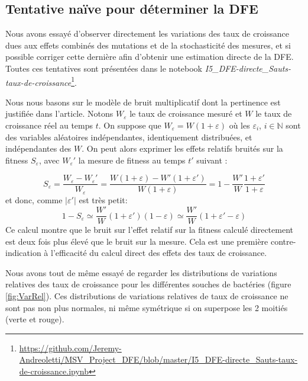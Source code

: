 \documentclass[12pt]{article}
\newcommand{\abs}[1]{\left|#1\right|}
\newcommand{\En}{\mathbb{N}}
\begin{document}
\FloatBarrier
\subsection{Tentative naïve pour déterminer la DFE}

Nous avons essayé d'observer directement les variations des taux de croissance dues aux effets combinés des mutations et de la stochasticité des mesures, et si possible corriger cette dernière afin d'obtenir une estimation directe de la DFE. Toutes ces tentatives sont présentées dans le notebook \emph{I5\_DFE-directe\_Sauts-taux-de-croissance}\footnote{\url{https://github.com/Jeremy-Andreoletti/MSV_Project_DFE/blob/master/I5_DFE-directe_Sauts-taux-de-croissance.ipynb}}.

Nous nous basons sur le modèle de bruit multiplicatif dont la pertinence est justifiée dans l'article.
Notons $W_\varepsilon$ le taux de croissance mesuré et $W$ le taux de croissance réel au temps $t$. On suppose que $W_\varepsilon=W(1+\varepsilon)$ où les $\varepsilon_i$, $i\in\En$ sont des variables aléatoires indépendantes, identiquement distribuées, et indépendantes des $W$. On peut alors exprimer les effets relatifs bruités sur la fitness $S_\varepsilon$, avec $W_\varepsilon'$ la mesure de fitness au temps $t'$ suivant :

\[S_\varepsilon=\frac{W_\varepsilon - W_\varepsilon'}{W_\varepsilon} 
= \frac{W(1+\varepsilon) - W'(1+\varepsilon')}{W(1+\varepsilon)}
= 1 - \frac{W'}{W}\frac{1+\varepsilon'}{1+\varepsilon}\]
et donc, comme $\abs{\varepsilon'}$ est très petit:
\[1 - S_\varepsilon \simeq \frac{W'}{W}(1+\varepsilon')(1-\varepsilon)\simeq \frac{W'}{W}(1+\varepsilon'-\varepsilon)\]
Ce calcul montre que le bruit sur l'effet relatif sur la fitness calculé directement est deux fois plus élevé que le bruit sur la mesure. Cela est une première contre-indication à l'efficacité du calcul direct des effets des taux de croissance.

Nous avons tout de même essayé de regarder les distributions de variations relatives des taux de croissance pour les différentes souches de bactéries (figure \ref{fig:VarRel}). Ces distributions de variations relatives de taux de croissance ne sont pas non plus normales, ni même symétrique si on superpose les 2 moitiés (verte et rouge).
\end{document}
